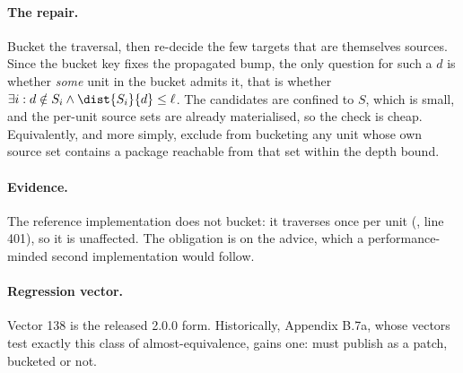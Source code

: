 \paragraph{The repair.} Bucket the traversal, then re-decide the few targets
that are themselves sources. Since the bucket key fixes the propagated bump,
the only question for such a $d$ is whether \emph{some} unit in the bucket
admits it, that is whether $\exists i: d \notin S_i \land \dist{S_i}{d} \leq
\ell$. The candidates are confined to $S$, which is small, and the per-unit
source sets are already materialised, so the check is cheap. Equivalently, and
more simply, exclude from bucketing any unit whose own source set contains a
package reachable from that set within the depth bound.

\paragraph{Evidence.} The reference implementation does not bucket: it
traverses once per unit (,
line 401), so it is unaffected. The obligation is on the advice, which a
performance-minded second implementation would follow.

\paragraph{Regression vector.} Vector 138 is the released 2.0.0 form. Historically, \SPEC{} Appendix B.7a, whose vectors test
exactly this class of almost-equivalence, gains one: 
must publish  as a patch, bucketed or not.
